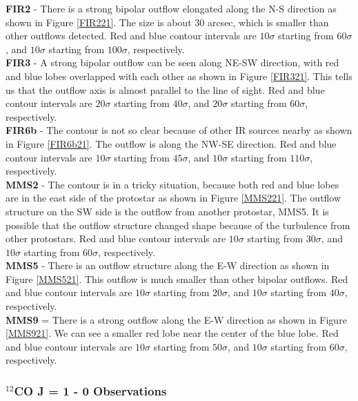 \noindent\textbf{FIR2} - There is a strong bipolar outflow elongated along the N-S direction as shown in Figure \ref{FIR221}. The size is about 30 arcsec, which is smaller than other outflows detected. Red and blue contour intervals are $10\sigma$ starting from $60\sigma$, and $10\sigma$ starting from $100\sigma$, respectively.\\
\textbf{FIR3} - A strong bipolar outflow can be seen along NE-SW direction, with red and blue lobes overlapped with each other as shown in Figure \ref{FIR321}. This tells us that the outflow axis is almost parallel to the line of sight. Red and blue contour intervals are $20\sigma$ starting from $40\sigma$, and $20\sigma$ starting from $60\sigma$, respectively. \\
\textbf{FIR6b} - The contour is not so clear because of other IR sources nearby as shown in Figure \ref{FIR6b21}. The outflow is along the NW-SE direction. Red and blue contour intervals are $10\sigma$ starting from $45\sigma$, and $10\sigma$ starting from $110\sigma$, respectively.\\
\textbf{MMS2} - The contour is in a tricky situation, because both red and blue lobes are in the east side of the protostar as shown in Figure \ref{MMS221}. The outflow structure on the SW side is the outflow from another protostar, MMS5. It is possible that the outflow structure changed shape because of the turbulence from other protostars. Red and blue contour intervals are $10\sigma$ starting from $30\sigma$, and $10\sigma$ starting from $60\sigma$, respectively.\\
\textbf{MMS5} - There is an outflow structure along the E-W direction as shown in Figure \ref{MMS521}. This outflow is much smaller than other bipolar outflows. Red and blue contour intervals are $10\sigma$ starting from $20\sigma$, and $10\sigma$ starting from $40\sigma$, respectively.\\
\textbf{MMS9} = There is a strong outflow along the E-W direction as shown in Figure \ref{MMS921}. We can see a smaller red lobe near the center of the blue lobe. Red and blue contour intervals are $10\sigma$ starting from $50\sigma$, and $10\sigma$ starting from $60\sigma$, respectively.\\

\subsubsection{$^{12}$CO J = 1 - 0 Observations}

